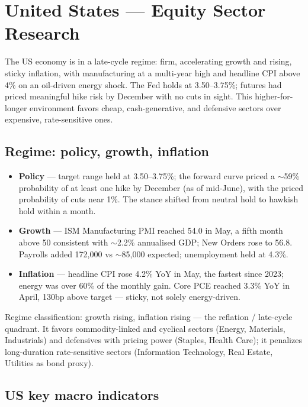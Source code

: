 \documentclass[11pt,a4paper]{article}
\begin{document}

\section{United States --- Equity Sector Research}

The US economy is in a late-cycle regime: firm, accelerating growth and rising, sticky inflation, with manufacturing at a multi-year high and headline CPI above 4\% on an oil-driven energy shock. The Fed holds at 3.50--3.75\%; futures had priced meaningful hike risk by December with no cuts in sight. This higher-for-longer environment favors cheap, cash-generative, and defensive sectors over expensive, rate-sensitive ones.

\subsection{Regime: policy, growth, inflation}

\begin{itemize}
\item \textbf{Policy} --- target range held at 3.50--3.75\%; the forward curve priced a \(\sim\)59\% probability of at least one hike by December (as of mid-June), with the priced probability of cuts near 1\%. The stance shifted from neutral hold to hawkish hold within a month.
\item \textbf{Growth} --- ISM Manufacturing PMI reached 54.0 in May, a fifth month above 50 consistent with \(\sim\)2.2\% annualised GDP; New Orders rose to 56.8. Payrolls added 172,000 vs \(\sim\)85,000 expected; unemployment held at 4.3\%.
\item \textbf{Inflation} --- headline CPI rose 4.2\% YoY in May, the fastest since 2023; energy was over 60\% of the monthly gain. Core PCE reached 3.3\% YoY in April, 130bp above target --- sticky, not solely energy-driven.
\end{itemize}

Regime classification: growth rising, inflation rising --- the reflation / late-cycle quadrant. It favors commodity-linked and cyclical sectors (Energy, Materials, Industrials) and defensives with pricing power (Staples, Health Care); it penalizes long-duration rate-sensitive sectors (Information Technology, Real Estate, Utilities as bond proxy).

\subsection{US key macro indicators}
\end{document}

